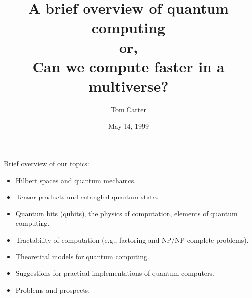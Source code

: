 \documentclass{slides}
\begin{document}
\def\ket#1{|{#1}\rangle}
\def\bra#1{\langle{#1}|}
\def\braket#1#2{\langle{#1}|{#2}\rangle}

\def\sectionhead#1{\begin{center}{\Large#1}\end{center}}

\def\hilbert{\mathit{H}}
\def\complex{\mathbb{C}}
\def\tensor{\otimes}
\def\lnanda{\land\negthickspace\negthickspace\negthinspace\sim}
\def\lnandb{\land\negthickspace\negthickspace\negmedspace\negthinspace\sim}
\def\lnandc{\land\negthickspace\negthickspace\negmedspace\negthinspace\negthinspace\sim}
\def\lnandd{\land\negthickspace\negthickspace\negmedspace\negthinspace\negthinspace\negthinspace\sim}

\def\col#1#2{\left(\begin{array}{c}#1\\#2\end{array}\right)}
\def\tcol#1#2{(#1, #2)^T}

\begin{slide}{}
\begin{center}
\title{{\LARGE\bf A brief overview of quantum computing} \\ or, \\ Can we compute faster in a multiverse?}
\author{Tom Carter}
\date{May 14, 1999}
\maketitle
\end{center}

\end{slide}

\begin{slide}{}
\sectionhead{Brief overview of our topics: }
\begin{itemize}
	\item Hilbert spaces and quantum mechanics.
	\item Tensor products and entangled quantum states.
	\item Quantum bits (qubits), the physics of computation, elements of quantum computing.
	\item Tractability of computation (e.g., factoring and NP/NP-complete problems).
	\item Theoretical models for quantum computing.
	\item Suggestions for practical implementations of quantum computers.
	\item Problems and prospects.
\end{itemize}

\end{slide}
\end{document}
